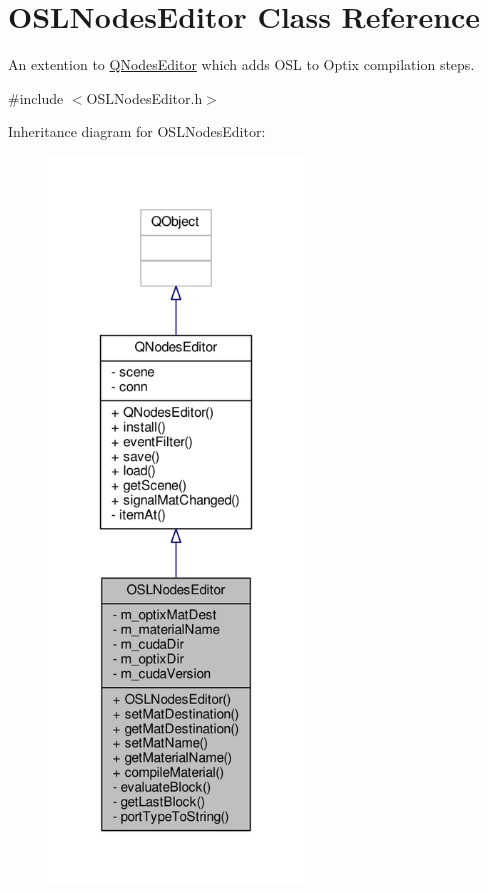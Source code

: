 \hypertarget{class_o_s_l_nodes_editor}{\section{O\-S\-L\-Nodes\-Editor Class Reference}
\label{class_o_s_l_nodes_editor}
}


An extention to \hyperlink{class_q_nodes_editor}{Q\-Nodes\-Editor} which adds O\-S\-L to Optix compilation steps.  




{\ttfamily \#include $<$O\-S\-L\-Nodes\-Editor.\-h$>$}



Inheritance diagram for O\-S\-L\-Nodes\-Editor\-:
\nopagebreak
\begin{figure}[H]
\begin{center}
\leavevmode
\includegraphics[width=192pt]{class_o_s_l_nodes_editor__inherit__graph}
\end{center}
\end{figure}


